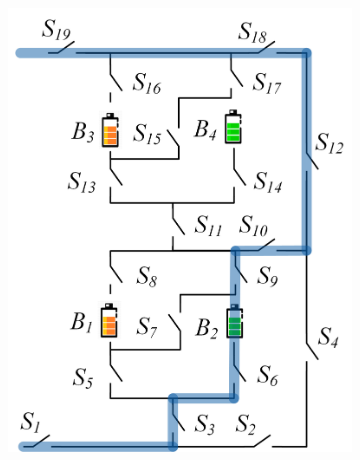 \documentclass{article}
\begin{document}
\begin{figure}[htbp]
\begin{subfigure}[b]{0.31\textwidth}
        \includegraphics[width=\textwidth]{e2f2-isolate-2w.png}
        \caption{}
        \label{fig:my-isolated-2w}
    \end{subfigure}
    \hspace{0.02\textwidth}
    \begin{subfigure}[b]{0.31\textwidth}

\end{subfigure}
\end{figure}
\end{document}
